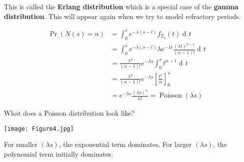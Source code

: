 \documentclass[11pt]{article}
\DeclareMathOperator{\dif}{d\!}
\DeclareMathOperator{\Poisson}{Poisson}
\begin{document}
This is called the {\bf Erlang distribution} which is a special case of the {\bf gamma distribution}.
This will appear again when we try to model refractory periods.


\begin{equation*}
\begin{split}
\Pr\left(N(s) = n\right)  &= \int_0^s e^{-\lambda (s - t)} f_{T_n}(t) \dif t \\
 &= \int_0^s e^{-\lambda (s - t)} \lambda e^{-\lambda t} \frac{ \left(\lambda t\right)^{n-1}}{\left( n-1\right)!}  \dif t \\
 &=  \frac{\lambda^n}{\left( n-1\right)!} e^{-\lambda s}  \int_0^s t^{n-1}  \dif t \\
 &=  \frac{\lambda^n}{\left( n-1\right)!} e^{-\lambda s}  \left[\frac{t^n}{n}\right]_0^s \\
 &=  e^{-\lambda s} \frac{\left(\lambda s\right)^n}{n!}  = \Poisson(\lambda s)
\end{split}
\end{equation*}

What does a Poisson distribution look like? 

\begin{center}
\texttt{[image: Figure4.jpg]}
\end{center}


For smaller $(\lambda s)$, the exponential term dominates. For larger
$(\lambda s)$, the polynomial term initially dominates.
\end{document}
